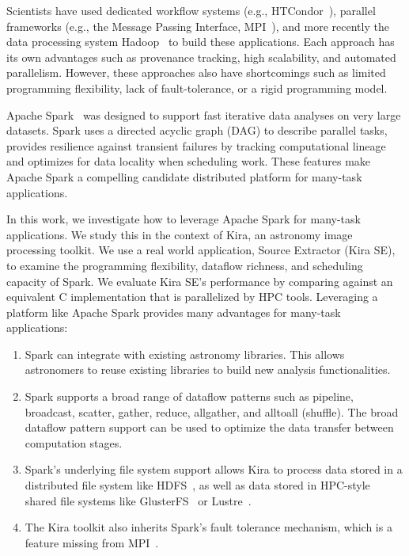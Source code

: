 \documentclass[conference]{IEEEtran}
\begin{document}
Scientists have used dedicated workflow systems (e.g., HTCondor~\cite{litzkow88}), parallel frameworks (e.g., the Message Passing Interface, MPI~\cite{gropp96}), and more recently the data processing system Hadoop~\cite{HADOOP}  to build these applications. Each approach has its own advantages such as provenance tracking, high scalability, and automated parallelism. However, these approaches also have shortcomings such as limited programming flexibility, lack of fault-tolerance, or a rigid programming model.


Apache Spark~\cite{zaharia12} was designed to support fast iterative data analyses on very large datasets.
Spark uses a directed acyclic graph (DAG) to describe parallel tasks, 
provides resilience against transient failures by tracking computational lineage
and optimizes for data locality when scheduling work.
These features make Apache Spark a compelling candidate distributed platform for many-task applications.

In this work, we investigate how to leverage Apache Spark for many-task applications.
We study this in the context of Kira, an astronomy image processing toolkit.
We use a real world application, Source Extractor (Kira SE), to examine the programming flexibility, dataflow richness,
and scheduling capacity of Spark. We evaluate Kira SE's performance by comparing against
an equivalent C implementation that is parallelized by HPC tools. Leveraging a platform like Apache Spark provides many advantages for many-task applications:
\begin{enumerate}
\item Spark can integrate with existing astronomy libraries.
This allows astronomers to reuse existing libraries to build new analysis functionalities.
\item Spark supports a broad range of dataflow patterns such as pipeline, broadcast, scatter, gather, reduce, allgather, 
and alltoall (shuffle). The broad dataflow pattern support can be used to optimize the data transfer between computation stages.
\item Spark's underlying file system support allows Kira to process data stored in a distributed file system like HDFS~\cite{shvachko10}, 
as well as data stored in HPC-style shared file systems like GlusterFS~\cite{davies13} or Lustre~\cite{donovan03}.
\item The Kira toolkit also inherits Spark's fault tolerance mechanism, which is a feature missing from MPI~\cite{gropp96}.
\end{enumerate}
\end{document}
